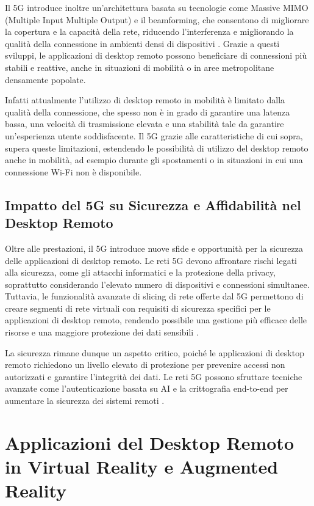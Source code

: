 \documentclass[12pt,a4paper,openright,twoside]{book}
\begin{document}
Il 5G introduce inoltre un'architettura basata su tecnologie come Massive MIMO (Multiple Input Multiple Output) e il beamforming, che consentono di migliorare la copertura e la capacità della rete, riducendo l'interferenza e migliorando la qualità della connessione in ambienti densi di dispositivi \cite{Dangi2021}. Grazie a questi sviluppi, le applicazioni di desktop remoto possono beneficiare di connessioni più stabili e reattive, anche in situazioni di mobilità o in aree metropolitane densamente popolate.

Infatti attualmente l'utilizzo di desktop remoto in mobilità è limitato dalla qualità della connessione, che spesso non è in grado di garantire una latenza bassa, una velocità di trasmissione elevata e una stabilità tale da garantire un'esperienza utente soddisfacente. Il 5G grazie alle caratteristiche di cui sopra, supera queste limitazioni, estendendo le possibilità di utilizzo del desktop remoto anche in mobilità, ad esempio durante gli spostamenti o in situazioni in cui una connessione Wi-Fi non è disponibile.

\subsection{Impatto del 5G su Sicurezza e Affidabilità nel Desktop Remoto}

Oltre alle prestazioni, il 5G introduce nuove sfide e opportunità per la sicurezza delle applicazioni di desktop remoto. Le reti 5G devono affrontare rischi legati alla sicurezza, come gli attacchi informatici e la protezione della privacy, soprattutto considerando l’elevato numero di dispositivi e connessioni simultanee. Tuttavia, le funzionalità avanzate di slicing di rete offerte dal 5G permettono di creare segmenti di rete virtuali con requisiti di sicurezza specifici per le applicazioni di desktop remoto, rendendo possibile una gestione più efficace delle risorse e una maggiore protezione dei dati sensibili \cite{Dangi2021}.

La sicurezza rimane dunque un aspetto critico, poiché le applicazioni di desktop remoto richiedono un livello elevato di protezione per prevenire accessi non autorizzati e garantire l'integrità dei dati. Le reti 5G possono sfruttare tecniche avanzate come l'autenticazione basata su AI e la crittografia end-to-end per aumentare la sicurezza dei sistemi remoti \cite{Sahu2024}.


\section{Applicazioni del Desktop Remoto in Virtual Reality e Augmented Reality}
\end{document}
